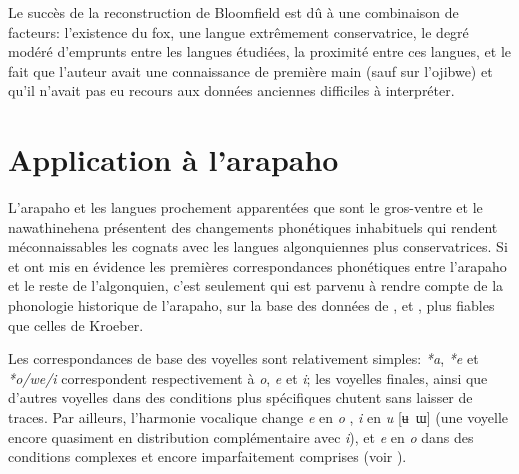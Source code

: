 \documentclass[twoside,a4paper,11pt]{article}
\newcommand{\ipa}[1]{{\phon\textit{#1}}}
\newcommand{\Σ}{\greek{Σ}}
\begin{document}
Le succès de la reconstruction de Bloomfield  est dû à une combinaison de facteurs: l'existence du fox, une langue extrêmement conservatrice, le degré modéré d'emprunts entre les langues étudiées, la proximité entre ces langues,  et le fait que l'auteur avait une connaissance de première main (sauf sur l'ojibwe) et qu'il n'avait pas eu recours aux données anciennes difficiles à interpréter.

\section{Application à l'arapaho}	
L'arapaho et les langues prochement apparentées que sont le gros-ventre et le nawathinehena présentent des changements phonétiques inhabituels qui rendent méconnaissables les cognats avec les langues algonquiennes plus conservatrices. Si \citet{kroeber16arapaho} et \citet{michelson35shifts} ont mis en évidence  les premières correspondances phonétiques entre l'arapaho et le reste de l'algonquien, c'est seulement  \citet{goddard74arapaho} qui est parvenu à rendre compte de la phonologie historique de l'arapaho, sur la base des données de \citet{salzmann56phono}, \citet{salzmann63arapaho} et \citet{taylor67atsina}, plus fiables que celles de Kroeber.
 
 Les correspondances de base des voyelles sont relativement simples: \ipa{*a}, \ipa{*e} et \ipa{*o/we/i} correspondent respectivement à \ipa{o}, \ipa{e} et \ipa{i}; les voyelles finales, ainsi que d'autres voyelles dans des conditions plus spécifiques  chutent sans laisser de traces. Par ailleurs, l'harmonie vocalique change  \ipa{e} en \ipa{o} , \ipa{i} en \ipa{u} [ʉ~ɯ] (une voyelle encore quasiment en distribution complémentaire avec \ipa{i}), et \ipa{e} en \ipa{o} dans des conditions complexes et encore imparfaitement comprises (voir \citealt[15-18, 20-22]{cowell06arapaho}).
 
\end{document}
